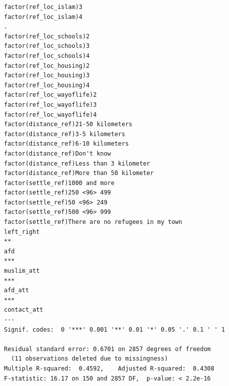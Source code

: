 \documentclass[
]{article}
\begin{document}
\begin{table}
\begin{minipage}[t]{\linewidth}
{\begin{verbatim}
factor(ref_loc_islam)3                                                               
factor(ref_loc_islam)4                                                            .  
factor(ref_loc_schools)2                                                             
factor(ref_loc_schools)3                                                             
factor(ref_loc_schools)4                                                             
factor(ref_loc_housing)2                                                             
factor(ref_loc_housing)3                                                             
factor(ref_loc_housing)4                                                             
factor(ref_loc_wayoflife)2                                                           
factor(ref_loc_wayoflife)3                                                           
factor(ref_loc_wayoflife)4                                                           
factor(distance_ref)21-50 kilometers                                                 
factor(distance_ref)3-5 kilometers                                                   
factor(distance_ref)6-10 kilometers                                                  
factor(distance_ref)Don't know                                                       
factor(distance_ref)Less than 3 kilometer                                            
factor(distance_ref)More than 50 kilometer                                           
factor(settle_ref)1000 and more                                                      
factor(settle_ref)250 <96> 499                                                       
factor(settle_ref)50 <96> 249                                                        
factor(settle_ref)500 <96> 999                                                       
factor(settle_ref)There are no refugees in my town                                   
left_right                                                                        ** 
afd                                                                               ***
muslim_att                                                                        ***
afd_att                                                                           ***
contact_att                                                                          
---
Signif. codes:  0 '***' 0.001 '**' 0.01 '*' 0.05 '.' 0.1 ' ' 1

Residual standard error: 0.6701 on 2857 degrees of freedom
  (11 observations deleted due to missingness)
Multiple R-squared:  0.4592,    Adjusted R-squared:  0.4308 
F-statistic: 16.17 on 150 and 2857 DF,  p-value: < 2.2e-16
\end{verbatim}

}

\end{minipage}%

\end{table}
\end{document}
